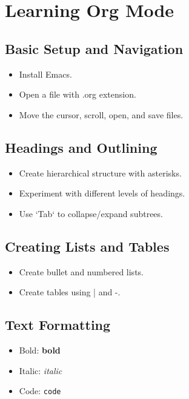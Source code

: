 \documentclass[11pt]{article}
\author{yang}
\date{\today}
\title{}
\begin{document}
\tableofcontents

\section{Learning Org Mode}
\label{sec:orgff98b35}

\subsection{Basic Setup and Navigation}
\label{sec:org0b418b2}
\begin{itemize}
\item Install Emacs.
\item Open a file with .org extension.
\item Move the cursor, scroll, open, and save files.
\end{itemize}

\subsection{Headings and Outlining}
\label{sec:org5b74e0e}
\begin{itemize}
\item Create hierarchical structure with asterisks.
\item Experiment with different levels of headings.
\item Use `Tab` to collapse/expand subtrees.
\end{itemize}

\subsection{Creating Lists and Tables}
\label{sec:org2b38e9a}
\begin{itemize}
\item Create bullet and numbered lists.
\item Create tables using | and -.
\end{itemize}

\subsection{Text Formatting}
\label{sec:org8787cbc}
\begin{itemize}
\item Bold: \textbf{bold}
\item Italic: \emph{italic}
\item Code: \texttt{code}
\end{itemize}
\end{document}
